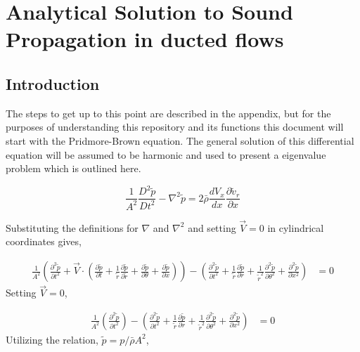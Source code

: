 
\section{Analytical Solution to Sound Propagation in ducted flows}
\subsection{Introduction}
The steps to get up to this point are described in the appendix, but for the
purposes of understanding this repository and its functions this document will 
start with the Pridmore-Brown equation. The general solution of this differential equation
will be assumed to be harmonic and used to present a eigenvalue problem which is
outlined here.    


\begin{equation}
    \frac{1}{A^2}\frac{D^2\tilde{p}}{Dt^2} -
    \nabla^2 \tilde{p} =
    2 \bar{\rho} \frac{d V_x}{d x} \frac{\partial  \tilde{v}_r}{ \partial x} 
    \label{eqn:KousensWaveEquation}
\end{equation}


Substituting the definitions for $\nabla$ and $\nabla^2$ and setting $\vec{V} =0$
in cylindrical coordinates gives,

\begin{align*} 
    \frac{1}{A^2}\left(
        \frac{\partial^2 \tilde{p}}{\partial t^2}
    + 
        \vec{V}\cdot \left(
            \frac{\partial\tilde{p}}{\partial t} + 
            \frac{1}{\tilde{r}}\frac{\partial \tilde{p} }{\partial \tilde{r}} +
            \frac{\partial \tilde{p}}{\partial \theta} +
            \frac{\partial \tilde{p}}{\partial x}  
        \right)  \right)-
        \left(
            \frac{\partial^2 \tilde{p}}{\partial t^2} + 
            \frac{1}{\tilde{r}}\frac{\partial \tilde{p}}{\partial r} +
            \frac{1}{\tilde{r}^2} \frac{\partial^2 \tilde{p}}{\partial \theta^2} + 
            \frac{\partial^2 \tilde{p}}{\partial x^2} 
        \right) &= 0  
\end{align*} 
Setting $\vec{V} = 0$,

\begin{align*} 
    \frac{1}{A^2}\left(
        \frac{\partial^2 \tilde{p}}{\partial t^2}
    \right) - 
        \left(
            \frac{\partial^2 \tilde{p}}{\partial t^2} + 
            \frac{1}{\tilde{r}}\frac{\partial \tilde{p}}{\partial  r}  +
            \frac{1}{\tilde{r}^2} \frac{\partial^2 \tilde{p}}{\partial \theta^2} + 
            \frac{\partial^2 \tilde{p}}{\partial x^2} 
        \right) &= 0  
\end{align*} 
Utilizing the relation, $\tilde{p} = p/\bar{\rho} A^2$,

